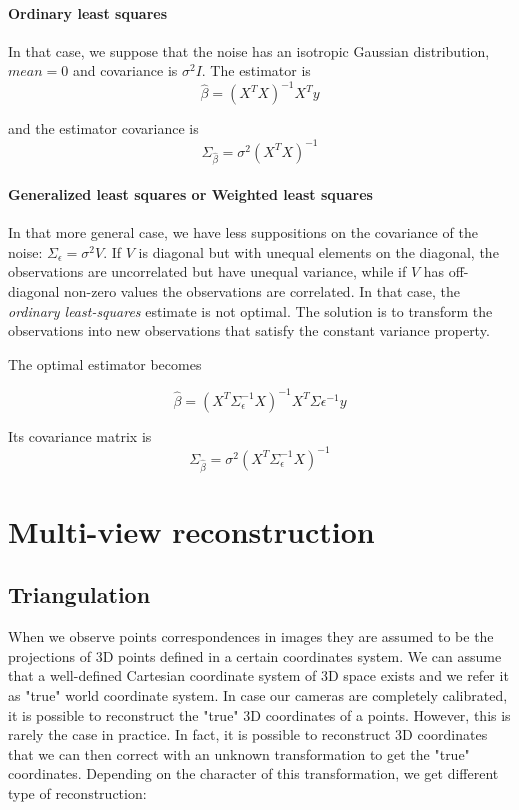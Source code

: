 \paragraph{Ordinary least squares}
In that case, we suppose that the noise has an isotropic Gaussian distribution, $mean = 0$ and covariance is $\sigma^2I$. The estimator is 
\begin{equation}
    \hat{\beta} = (X^T X)^{-1}X^Ty
\end{equation}

and the estimator covariance is
\begin{equation}
    \Sigma_{\hat{\beta}} = \sigma^2 (X^T X)^{-1}
\end{equation}

\paragraph{Generalized least squares or Weighted least squares}

In that more general case, we have less suppositions on the covariance of the noise: $\Sigma_{\epsilon} = \sigma^2 V$. If $V$ is diagonal but with unequal elements on the diagonal, the observations are uncorrelated but have unequal variance, while if $V$ has off-diagonal non-zero values the observations are correlated. In that case, the \textit{ordinary least-squares} estimate is not optimal. The solution is to transform the observations into new observations that satisfy the constant variance property.

The optimal estimator becomes

\begin{equation}
    \hat{\beta} = (X^T \Sigma_{\epsilon}^{-1} X)^{-1} X^T \Sigma{\epsilon}^{-1} y
\end{equation}

Its covariance matrix is 
\begin{equation}
   \Sigma_{\hat{\beta}} = \sigma^2 (X^T \Sigma_{\epsilon}^{-1} X)^{-1}
\end{equation}


\section{Multi-view reconstruction}

\subsection{Triangulation}

When we observe points correspondences in images they are assumed to be the projections of 3D points defined in a certain coordinates system. We can assume that a well-defined Cartesian coordinate system of 3D space exists and we refer it as "true" world coordinate system. 
In case our cameras are completely calibrated, it is possible to reconstruct the "true" 3D coordinates of a points. However, this is rarely the case in practice. In fact, it is possible to reconstruct 3D coordinates that we can then correct with an unknown transformation to get the "true" coordinates. Depending on the character of this transformation, we get different type of reconstruction:

